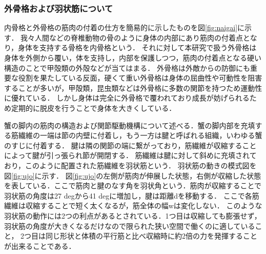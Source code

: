 \subsubsection{外骨格および羽状筋について}
内骨格と外骨格の筋肉の付着の仕方を簡易的に示したものを図\ref{fig:naigai}に示す．
我々人間などの脊椎動物の骨のように身体の内部にあり筋肉の付着点となり，身体を支持する骨格を内骨格という．
それに対して本研究で扱う外骨格は身体を外側から覆い，体を支持し，内部を保護しつつ，筋肉の付着点となる硬い構造のことで甲殻類の外殻などが当てはまる．
外骨格は外敵からの防御にも重要な役割を果たしている反面，硬くて重い外骨格は身体の屈曲性や可動性を阻害することが多いが，甲殻類，昆虫類などは外骨格に多数の関節を持つため運動性に優れている．
しかし身体は完全に外骨格で覆われており成長が妨げられるため定期的に脱皮を行うことで身体を大きくしている．

蟹の脚内の筋肉の構造および関節駆動機構について述べる．蟹の脚内部を充填する筋繊維の一端は節の内壁に付着し，もう一方は腱と呼ばれる組織，いわゆる蟹のすじに付着する．
腱は隣の関節の端に繋がっており，筋繊維が収縮することによって腱が引っ張られ節が開閉する．
筋繊維は腱に対して斜めに充填されており，このように配置された筋繊維を羽状筋という．
羽状筋の動きの模式図を図\ref{fig:ujo}に示す．
図\ref{fig:ujo}の左側が筋肉が伸展した状態，右側が収縮した状態を表している．ここで筋肉と腱のなす角を羽状角という．筋肉が収縮することで羽状筋の角度は27 degから41 degに増加し，腱は距離dを移動する．
ここで各筋繊維は収縮することで短く太くなるが，筋全体の幅wは変化しない．
このような羽状筋の動作には2つの利点があるとされている．1つ目は収縮しても膨張せず，羽状筋の角度が大きくなるだけなので限られた狭い空間で働くのに適していること，
2つ目は同じ形状と体積の平行筋と比べ収縮時に約2倍の力を発揮することが出来ることである\cite{warner1977biology}．

